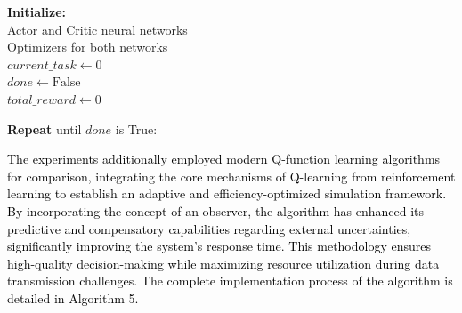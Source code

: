 \documentclass[preprint,12pt]{elsarticle}
\begin{document}
\begin{algorithm}[H]
    \caption{Actor-Critic Task Offloading}
    \label{alg:4}
    \textbf{Initialize:}\\
        Actor and Critic neural networks\\
        Optimizers for both networks\\
        $current\_task \gets 0$\\
        $done \gets \text{False}$\\
        $total\_reward \gets 0$
    
    \textbf{Repeat} until $done$ is True:\\
    \end{algorithm}
    
    
\textcolor{black}{The experiments additionally employed modern Q-function learning algorithms for comparison, integrating the core mechanisms of Q-learning from reinforcement learning to establish an adaptive and efficiency-optimized simulation framework\cite{pham2022disturbance,vu2022online}. By incorporating the concept of an observer, the algorithm has enhanced its predictive and compensatory capabilities regarding external uncertainties, significantly improving the system's response time\cite{nguyen2024policy}. This methodology ensures high-quality decision-making while maximizing resource utilization during data transmission challenges. The complete implementation process of the algorithm is detailed in Algorithm 5.}
\end{document}
